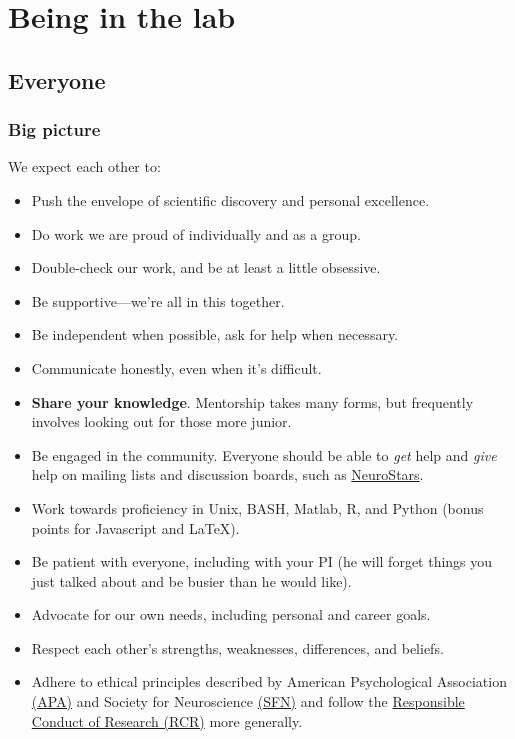 \documentclass[letterpaper,12pt,oneside]{memoir}
\begin{document}
\chapter{Being in the lab}

\section{Everyone}

\subsection{Big picture}

We expect each other to:

\begin{itemize}
\item Push the envelope of scientific discovery and personal excellence. 
\item Do work we are proud of individually and as a group.
\item Double-check our work, and be at least a little obsessive.
\item Be supportive---we're all in this together.
\item Be independent when possible, ask for help when necessary.
\item Communicate honestly, even when it's difficult.
\item \textbf{Share your knowledge}. Mentorship takes many forms, but frequently involves looking out for those more junior.
\item Be engaged in the community. Everyone should be able to \textit{get} help and \textit{give} help on mailing lists and discussion boards, such as \href{https://neurostars.org}{NeuroStars}.
\item Work towards proficiency in Unix, BASH, Matlab, R, and Python (bonus points for Javascript and \LaTeX).
\item Be patient with everyone, including with your PI (he will forget things you just talked about and be busier than he would like).
\item Advocate for our own needs, including personal and career goals.
\item Respect each other's strengths, weaknesses, differences, and beliefs.
\item Adhere to ethical principles described by American Psychological Association \href{https://www.apa.org/ethics/code/}{(APA)} and Society for Neuroscience \href{https://web.sfn.org/sfn/member-center/professional-conduct/sfn-ethics-policy}{(SFN)} and follow the \href{https://ori.hhs.gov/ori-introduction-responsible-conduct-research}{Responsible Conduct of Research (RCR)} more generally. 

\end{itemize}
\end{document}
